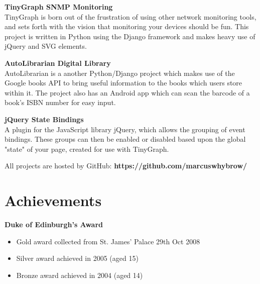 \documentclass[margin,line]{resume}
\begin{document}
\begin{resume}
    \textbf{TinyGraph SNMP Monitoring}\vspace{1mm}\\%
    TinyGraph is born out of the frustration of using other network monitoring tools, and sets forth with the vision that monitoring your devices should be fun. This project is written in Python using the Django framework and makes heavy use of jQuery and SVG elements.
    \vspace{-1.5mm}
    
    \textbf{AutoLibrarian Digital Library}\vspace{1mm}\\%
    AutoLibrarian is a another Python/Django project which makes use of the Google books API to bring useful information to the books which users store within it. The project also has an Android app which can scan the barcode of a book's ISBN number for easy input.
    \vspace{-1.5mm}
    
    \textbf{jQuery State Bindings}\vspace{1mm}\\%
	A plugin for the JavaScript library jQuery, which allows the grouping of event bindings. These groups can then be enabled or disabled based upon the global "state" of your page, created for use with TinyGraph.
    \vspace{-1.5mm}
    
    All projects are hosted by GitHub: {\bf https://github.com/marcuswhybrow/}
    
    \section{\mysidestyle Achievements}

    \textbf{Duke of Edinburgh's Award}\vspace{-4mm}\\%
    \begin{itemize}
		\item Gold award collected from St. James' Palace 29th Oct 2008
		\item Silver award achieved in 2005 (aged 15)
		\item Bronze award achieved in 2004 (aged 14)
    \end{itemize}
    \vspace{-4mm}
    

\end{resume}
\end{document}
